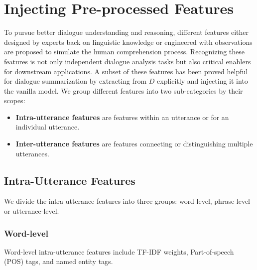 \section{Injecting Pre-processed Features} 
\label{sec:feature}
To pursue better dialogue understanding and reasoning, different features either designed by experts back on linguistic knowledge or engineered with observations are proposed to simulate the human comprehension process.
Recognizing these features is not only independent dialogue analysis 
tasks but also critical enablers for downstream applications. 
A subset of these features has been proved helpful for dialogue summarization by extracting from $D$ explicitly and injecting it into the vanilla model.
We group different features into two sub-categories by their scopes:
\begin{itemize}
	\item \textbf{Intra-utterance features} are features within an utterance or for an individual utterance.
	\item \textbf{Inter-utterance features} are features connecting or distinguishing multiple utterances.
\end{itemize}



\subsection{Intra-Utterance Features}

We divide the intra-utterance features into three groups: word-level, 
phrase-level or utterance-level.


\subsubsection{Word-level}
Word-level intra-utterance features include TF-IDF weights, Part-of-speech (POS) tags, and named entity tags.

